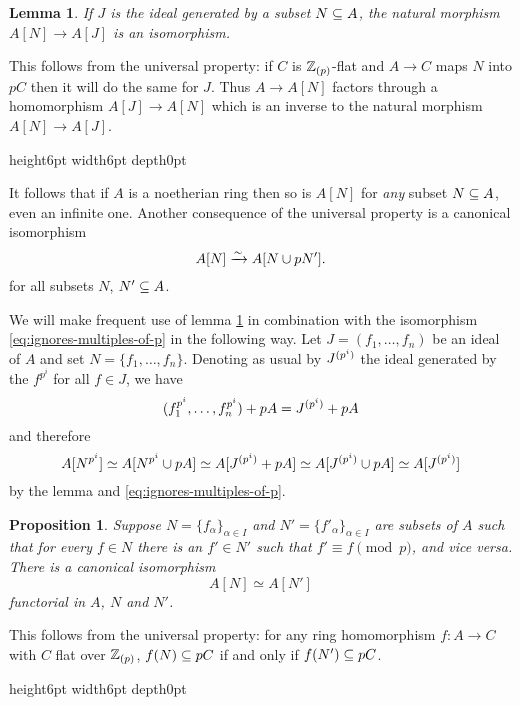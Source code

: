 \documentclass{article}
\theoremstyle{change}
\newtheorem{prop}[subsubsection]{Proposition}
\newtheorem{lemma}[subsubsection]{Lemma}
\numberwithin{equation}{subsubsection}
\newcommand{\demobox}{\vrule height6pt width6pt depth0pt}
\newenvironment{demo}{\noindent{\it Proof.}}
{{\unskip\nobreak\hfil\qquad
\demobox\parfillskip=0pt\par}
\medskip}
\newenvironment{remark}{\medskip\noindent{\textit{Remark.}}}{\medskip}
\begin{document}
\begin{lemma}\label{lemma:tubes-and-generators}
  If $J$ is the ideal generated by a subset $N\subseteq A$, the
  natural morphism $A[N]\to A[J]$ is an isomorphism.
\end{lemma}
\begin{demo}
  This follows from the universal property: if $C$ is ${\mathbb Z}_{(p)}$-flat
  and $A\to C$ maps $N$ into $pC$ then it will do the same for
  $J$. Thus $A\to A[N]$ factors through a homomorphism $A[J]\to A[N]$
  which is an inverse to the natural morphism $A[N]\to A[J]$.
\end{demo}

It follows that if $A$ is a noetherian ring then so is $A[N]$ for
\textit{any} subset $N\subseteq A$, even an infinite one. Another
consequence of the universal property is a canonical isomorphism
\begin{equation}
  \label{eq:ignores-multiples-of-p}
  A[N]\xrightarrow{\sim} A[N\cup pN'].
\end{equation}
for all subsets $N$, $N'\subseteq A$.

\begin{remark}
  We will make frequent use of lemma \ref{lemma:tubes-and-generators}
  in combination with the isomorphism \ref{eq:ignores-multiples-of-p}
  in the following way. Let $J=(f_1,\ldots,f_n)$ be an ideal of $A$
  and set $N=\{f_1,\ldots,f_n\}$. Denoting as usual by ${J}^{({p^i})}$
  the ideal generated by the $f^{p^i}$ for all $f\in J$, we have
  \begin{displaymath}
    (f_1^{p^i},\ldots,f_n^{p^i})+pA={J}^{({p^i})}+pA
  \end{displaymath}
  and therefore
  \begin{equation}
    \label{eq:tubes-and-generators}
    A[N^{p^i}]\simeq A[N^{p^i}\cup pA]\simeq A[{J}^{({p^i})}+pA]
    \simeq A[{J}^{({p^i})}\cup pA]\simeq A[{J}^{({p^i})}]    
  \end{equation}
  by the lemma and \ref{eq:ignores-multiples-of-p}.
\end{remark}

\begin{prop}\label{prop:independence-of-tube-mod-p}
  Suppose $N=\{f_\alpha\}_{\alpha\in I}$ and
  $N'=\{f'_\alpha\}_{\alpha\in I}$ are subsets of $A$ such that for
  every $f\in N$ there is an $f'\in N'$ such that
  $f'\equiv f\pmod{p}$, and \textit{vice versa}. There is a canonical
  isomorphism
  \begin{equation}
    \label{eq:invariance-of-A[N]}
    A[N]\simeq A[N']
  \end{equation}
  functorial in $A$, $N$ and $N'$.
\end{prop}
\begin{demo}
  This follows from the universal property: for any ring homomorphism
  $f:A\to C$ with $C$ flat over ${\mathbb Z}_{(p)}$, $f(N)\subseteq pC$ if and
  only if $f(N')\subseteq pC$.
\end{demo}
\end{document}
